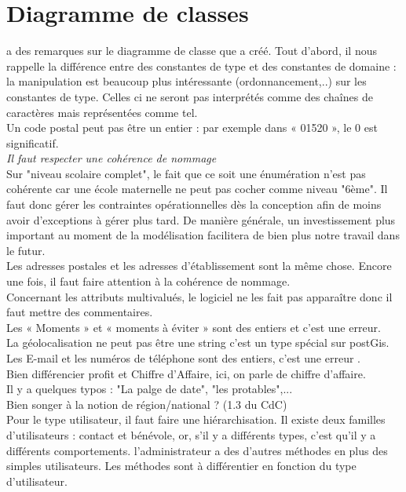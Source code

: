 \documentclass [a4paper] {article}
\begin{document}
\section{Diagramme de classes}
\nomTuteurPedago{} a des remarques sur le diagramme de classe que \Julie{} a créé. Tout d'abord, il nous rappelle la différence entre des constantes de type et des constantes de domaine : la manipulation est beaucoup plus intéressante (ordonnancement,..) sur les constantes de type. Celles ci ne seront pas interprétés comme des chaînes de caractères mais représentées comme tel. \\
Un code postal peut pas être un entier : par exemple dans « 01520 », le 0 est significatif. \\
\emph{Il faut respecter une cohérence de nommage} \\
Sur "niveau scolaire complet", le fait que ce soit une énumération n'est pas cohérente car une école maternelle ne peut pas cocher comme niveau "6ème". Il faut donc gérer les contraintes opérationnelles dès la conception afin de moins avoir d'exceptions à gérer plus tard. De manière générale, un investissement plus important au moment de la modélisation facilitera de bien plus notre travail dans le futur. \\
Les adresses postales et les adresses d’établissement sont la même chose. Encore une fois, il faut faire attention à la cohérence de nommage.\\
Concernant les attributs multivalués, le logiciel ne les fait pas apparaître donc il faut mettre des commentaires.\\
Les « Moments » et « moments à éviter » sont des entiers et c'est une erreur. \\
La géolocalisation ne peut pas être une string c'est un type spécial sur postGis.\\
Les E-mail et les numéros de téléphone sont des entiers, c'est une erreur .\\
Bien différencier profit et Chiffre d'Affaire, ici, on parle de chiffre d'affaire.\\
Il y a quelques typos : "La palge de date", "les protables",...\\
Bien songer à la notion de région/national ? (1.3 du CdC) \\
Pour le type utilisateur, il faut faire une hiérarchisation. Il existe deux familles d'utilisateurs : contact et bénévole, or, s'il y a différents types, c'est qu'il y a différents comportements. l'administrateur a des d'autres méthodes en plus des simples utilisateurs. Les méthodes sont à différentier en fonction du type d'utilisateur.\\
\end{document}
